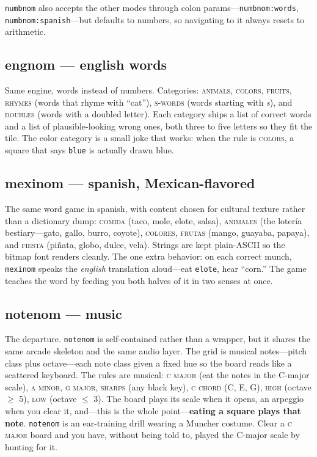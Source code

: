 \documentclass[10pt,letterpaper,twocolumn]{article}
\begin{document}
\texttt{numbnom} also accepts the other modes through colon params---\texttt{numbnom:words}, \texttt{numbnom:spanish}---but defaults to numbers, so navigating to it always resets to arithmetic.

\subsection{engnom --- english words}

Same engine, words instead of numbers. Categories: \textsc{animals}, \textsc{colors}, \textsc{fruits}, \textsc{rhymes} (words that rhyme with ``cat''), \textsc{s-words} (words starting with \emph{s}), and \textsc{doubles} (words with a doubled letter). Each category ships a list of correct words and a list of plausible-looking wrong ones, both three to five letters so they fit the tile. The color category is a small joke that works: when the rule is \textsc{colors}, a square that says \texttt{blue} is actually drawn blue.

\subsection{mexinom --- spanish, Mexican-flavored}

The same word game in spanish, with content chosen for cultural texture rather than a dictionary dump: \textsc{comida} (taco, mole, elote, salsa), \textsc{animales} (the lotería bestiary---gato, gallo, burro, coyote), \textsc{colores}, \textsc{frutas} (mango, guayaba, papaya), and \textsc{fiesta} (piñata, globo, dulce, vela). Strings are kept plain-ASCII so the bitmap font renders cleanly. The one extra behavior: on each correct munch, \texttt{mexinom} speaks the \emph{english} translation aloud---eat \texttt{elote}, hear ``corn.'' The game teaches the word by feeding you both halves of it in two senses at once.

\subsection{notenom --- music}

The departure. \texttt{notenom} is self-contained rather than a wrapper, but it shares the same arcade skeleton and the same audio layer. The grid is musical notes---pitch class plus octave---each note class given a fixed hue so the board reads like a scattered keyboard. The rules are musical: \textsc{c major} (eat the notes in the C-major scale), \textsc{a minor}, \textsc{g major}, \textsc{sharps} (any black key), \textsc{c chord} (C, E, G), \textsc{high} (octave $\geq$ 5), \textsc{low} (octave $\leq$ 3). The board plays its scale when it opens, an arpeggio when you clear it, and---this is the whole point---\textbf{eating a square plays that note}. \texttt{notenom} is an ear-training drill wearing a Muncher costume. Clear a \textsc{c major} board and you have, without being told to, played the C-major scale by hunting for it.
\end{document}
